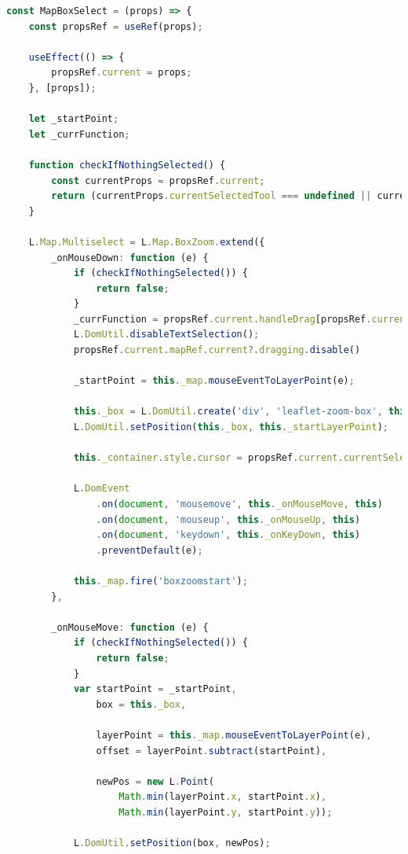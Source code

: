 \begin{lstlisting}[language=Typescript, caption={Multiselect Tool},label={lst:multiselect-tool}]
const MapBoxSelect = (props) => {
    const propsRef = useRef(props);

    useEffect(() => {
        propsRef.current = props;
    }, [props]);

    let _startPoint;
    let _currFunction;

    function checkIfNothingSelected() {
        const currentProps = propsRef.current;
        return (currentProps.currentSelectedTool === undefined || currentProps.currentSelectedTool === null || !(currentProps.currentSelectedTool.id in currentProps.handleDrag));
    }

    L.Map.Multiselect = L.Map.BoxZoom.extend({
        _onMouseDown: function (e) {
            if (checkIfNothingSelected()) {
                return false;
            }
            _currFunction = propsRef.current.handleDrag[propsRef.current.currentSelectedTool.id]
            L.DomUtil.disableTextSelection();
            propsRef.current.mapRef.current?.dragging.disable()

            _startPoint = this._map.mouseEventToLayerPoint(e);

            this._box = L.DomUtil.create('div', 'leaflet-zoom-box', this._pane);
            L.DomUtil.setPosition(this._box, this._startLayerPoint);

            this._container.style.cursor = propsRef.current.currentSelectedTool;

            L.DomEvent
                .on(document, 'mousemove', this._onMouseMove, this)
                .on(document, 'mouseup', this._onMouseUp, this)
                .on(document, 'keydown', this._onKeyDown, this)
                .preventDefault(e);

            this._map.fire('boxzoomstart');
        },

        _onMouseMove: function (e) {
            if (checkIfNothingSelected()) {
                return false;
            }
            var startPoint = _startPoint,
                box = this._box,

                layerPoint = this._map.mouseEventToLayerPoint(e),
                offset = layerPoint.subtract(startPoint),

                newPos = new L.Point(
                    Math.min(layerPoint.x, startPoint.x),
                    Math.min(layerPoint.y, startPoint.y));

            L.DomUtil.setPosition(box, newPos);


\end{lstlisting}

